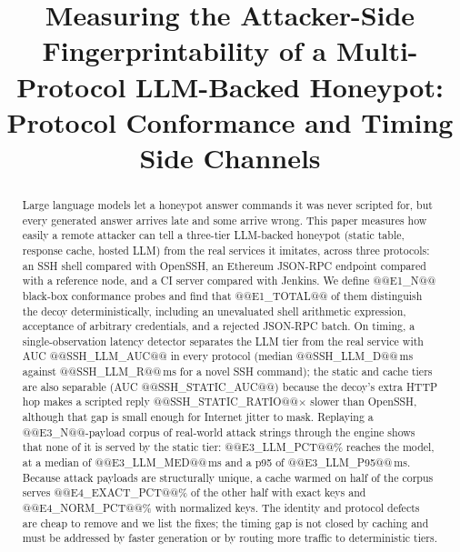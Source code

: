 \documentclass[conference]{IEEEtran}
\begin{document}
\title{Measuring the Attacker-Side Fingerprintability of a Multi-Protocol LLM-Backed Honeypot:\\Protocol Conformance and Timing Side Channels}

\author{
}

\maketitle

\begin{abstract}
Large language models let a honeypot answer commands it was never scripted for, but every generated answer arrives late and some arrive wrong. This paper measures how easily a remote attacker can tell a three-tier LLM-backed honeypot (static table, response cache, hosted LLM) from the real services it imitates, across three protocols: an SSH shell compared with OpenSSH, an Ethereum JSON-RPC endpoint compared with a reference node, and a CI server compared with Jenkins. We define @@E1_N@@ black-box conformance probes and find that @@E1_TOTAL@@ of them distinguish the decoy deterministically, including an unevaluated shell arithmetic expression, acceptance of arbitrary credentials, and a rejected JSON-RPC batch. On timing, a single-observation latency detector separates the LLM tier from the real service with AUC @@SSH_LLM_AUC@@ in every protocol (median @@SSH_LLM_D@@\,ms against @@SSH_LLM_R@@\,ms for a novel SSH command); the static and cache tiers are also separable (AUC @@SSH_STATIC_AUC@@) because the decoy's extra HTTP hop makes a scripted reply @@SSH_STATIC_RATIO@@$\times$ slower than OpenSSH, although that gap is small enough for Internet jitter to mask. Replaying a @@E3_N@@-payload corpus of real-world attack strings through the engine shows that none of it is served by the static tier: @@E3_LLM_PCT@@\% reaches the model, at a median of @@E3_LLM_MED@@\,ms and a p95 of @@E3_LLM_P95@@\,ms. Because attack payloads are structurally unique, a cache warmed on half of the corpus serves @@E4_EXACT_PCT@@\% of the other half with exact keys and @@E4_NORM_PCT@@\% with normalized keys. The identity and protocol defects are cheap to remove and we list the fixes; the timing gap is not closed by caching and must be addressed by faster generation or by routing more traffic to deterministic tiers.
\end{abstract}
\end{document}
